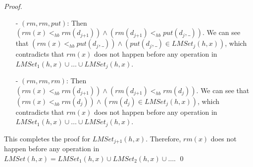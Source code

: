 \documentclass{llncs}
\begin{document}
\begin {proof}
\begin{itemize}
\begin{itemize}
    \item[-] If $\textit{put}(d_{\textit{ind}},\_) <_{hb} \textit{put}(d_{\textit{ind-1}},\_)$ and $\textit{rm}(d_{\textit{ind-1}})$ happens before operations of $d_{\textit{ind-2}}$, then by interval order, we know that $\textit{put}(d_{\textit{ind}},\_)$ happens before operation of $d_{\textit{ind-2}}$, or $\textit{rm}(d_{\textit{ind-1}}) <_{hb} \textit{put}(d_{\textit{ind-1}},\_)$, which is impossible.

    \item[-] If $\textit{put}(d_{\textit{ind}},\_) <_{hb} \textit{rm}(d_{\textit{ind-1}})$, then we obtain $T_{\textit{ind-1}}$, which already contain contradiction.
    \end{itemize}

    By base case $1$, base case $2$ and the induction step, it is easy to see that $T_j$ contains contradiction.

\item[-] $(\textit{rm},\textit{rm},\textit{put})$: Then $( \textit{rm}(x) <_{hb} \textit{rm}(d_{\textit{j+1}}) ) \wedge ( \textit{rm}(d_{\textit{j+1}}) <_{hb} \textit{put}(d_j,\_) )$. We can see that $( \textit{rm}(x) <_{hb} \textit{put}(d_j,\_) ) \wedge ( \textit{put}(d_j,\_) \in \textit{LMSet}_j(h,x) )$, which contradicts that $\textit{rm}(x)$ does not happen before any operation in $\textit{LMSet}_1(h,x) \cup \ldots \cup \textit{LMSet}_j(h,x)$.

\item[-] $(\textit{rm},\textit{rm},\textit{rm})$: Then $( \textit{rm}(x) <_{hb} \textit{rm}(d_{\textit{j+1}}) ) \wedge ( \textit{rm}(d_{\textit{j+1}}) <_{hb} \textit{rm}(d_j) )$. We can see that $( \textit{rm}(x) <_{hb} \textit{rm}(d_j) ) \wedge ( \textit{rm}(d_j) \in \textit{LMSet}_j(h,x) )$, which contradicts that $\textit{rm}(x)$ does not happen before any operation in $\textit{LMSet}_1(h,x) \cup \ldots \cup \textit{LMSet}_j(h,x)$.
\end{itemize}

This completes the proof for $\textit{LMSet}_{\textit{j+1}}(h,x)$. Therefore, $\textit{rm}(x)$ does not happen before any operation in $\textit{LMSet}(h,x) = \textit{LMSet}_1(h,x) \cup \textit{LMSet}_2(h,x) \cup \ldots$. \qed
\end {proof}
\end{document}
